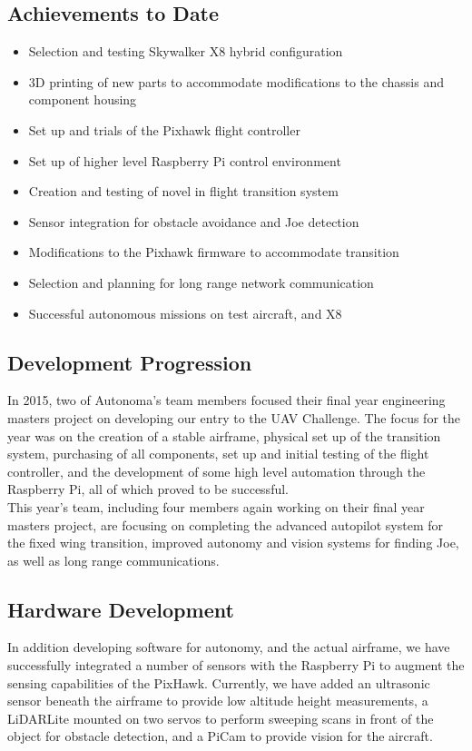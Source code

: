 \subsection{Achievements to Date}
\begin{itemize}
	\item Selection and testing Skywalker X8 hybrid configuration
	\item 3D printing of new parts to accommodate modifications to the chassis and component housing 
	\item Set up and trials of the Pixhawk flight controller
	\item Set up of higher level Raspberry Pi control environment
	\item Creation and testing of novel in flight transition system
	\item Sensor integration for obstacle avoidance and Joe detection
	\item Modifications to the Pixhawk firmware to accommodate transition
	\item Selection and planning for long range network communication
	\item Successful autonomous missions on test aircraft, and X8
\end{itemize}

\subsection{Development Progression}
In 2015, two of Autonoma's team members focused their final year engineering masters project on developing our entry to the UAV Challenge. The focus for the year was on the creation of a stable airframe, physical set up of the transition system, purchasing of all components, set up and initial testing of the flight controller, and the development of some high level automation through the Raspberry Pi, all of which proved to be successful.\\

This year's team, including four members again working on their final year masters project, are focusing on completing the advanced autopilot system for the fixed wing transition, improved autonomy and vision systems for finding Joe, as well as long range communications.

\subsection{Hardware Development}
In addition developing software for autonomy, and the actual airframe, we have successfully integrated a number of sensors with the Raspberry Pi to augment the sensing capabilities of the PixHawk. Currently, we have added an ultrasonic sensor beneath the airframe to provide low altitude height measurements, a LiDARLite mounted on two servos to perform sweeping scans in front of the object for obstacle detection, and a PiCam to provide vision for the aircraft.

